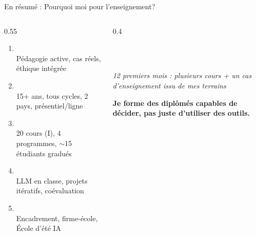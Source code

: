 \documentclass[aspectratio=169,11pt]{beamer}
\begin{document}
\begin{frame}{En résumé : Pourquoi moi pour l'enseignement?}
  \begin{columns}[T]
    \begin{column}{0.55\textwidth}
      \begin{enumerate}
        \item[1.] \\
        {\small Pédagogie active, cas réels, éthique intégrée}
        \vspace{0.25em}
        \item[2.] \\
        {\small 15+ ans, tous cycles, 2 pays, présentiel/ligne}
        \vspace{0.25em}
        \item[3.] \\
        {\small 20 cours (I), 4 programmes, $\sim$15 étudiants gradués}
        \vspace{0.25em}
        \item[4.] \\
        {\small LLM en classe, projets itératifs, coévaluation}
        \vspace{0.25em}
        \item[5.] \\
        {\small Encadrement, firme-école, École d'été IA}
      \end{enumerate}
    \end{column}
    \begin{column}{0.4\textwidth}
      \centering
      \colorbox{ushervert}{\parbox{3.8cm}{\centering\textcolor{white}{\large\bfseries Prêt à contribuer\\dès le jour 1}}}
      
      \vspace{0.5em}
      
      {\scriptsize\textit{12 premiers mois : plusieurs cours + un cas d'enseignement issu de mes terrains}}
      
      \vspace{0.5em}
      
      {\small\textbf{Je forme des diplômés capables de décider, pas juste d'utiliser des outils.}}
    \end{column}
  \end{columns}
\end{frame}
\end{document}
